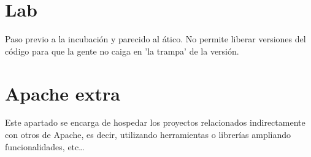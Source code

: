 \documentclass[11pt]{scrartcl}
\begin{document}

\section{Lab}
\label{sec:lab}

\par Paso previo a la incubación y parecido al ático. No permite liberar versiones del código para que la gente no caiga en 'la trampa' de la versión.


\section{Apache extra}
\label{sec:extra}

\par Este apartado se encarga de hospedar los proyectos relacionados indirectamente con otros de Apache, es decir, utilizando herramientas o librerías ampliando funcionalidades, etc\ldots

\end{document}
